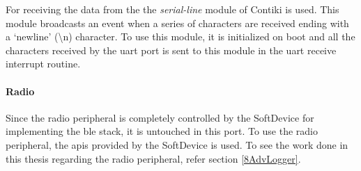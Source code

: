 For receiving the data from the the \emph{serial-line} module of Contiki is used. This module broadcasts an event when a series of characters are received ending with a `newline' (\textbackslash n) character. To use this module, it is initialized on boot and all the characters received by the \gls{uart} port is sent to this module in the \gls{uart} receive interrupt routine.

\paragraph{Radio} 

Since the radio peripheral is completely controlled by the SoftDevice for implementing the \gls{ble} stack, it is untouched in this port. To use the radio peripheral, the \glspl{api} provided by the SoftDevice is used. To see the work done in this thesis regarding the radio peripheral, refer section \ref{8AdvLogger}.

